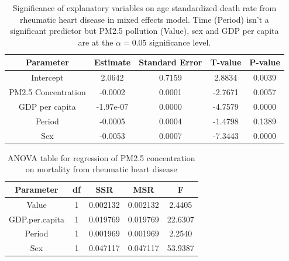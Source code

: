 \documentclass[12pt, letterpaper, twoside]{article}\usepackage[]{graphicx}\usepackage[]{xcolor}
\begin{document}
\begin{table}[h!]
\centering
\begin{tabular}{|c | c c c c|}
\toprule
Parameter & Estimate & Standard Error & T-value & P-value \\ [0.5ex]
\midrule
Intercept &	2.0642 &	0.7159 &	2.8834 &	0.0039 \\
PM2.5 Concentration &	-0.0002 &	0.0001 &	-2.7671 &	0.0057 \\
GDP per capita &	-1.97e-07		 &	0.0000 &	-4.7579 &	0.0000 \\
Period &	-0.0005 &	0.0004 &	-1.4798 &	0.1389 \\
Sex &	-0.0053 &	0.0007 &	-7.3443 &	0.0000 \\[1ex]
\bottomrule
\end{tabular}
\label{tab:table3}
  \caption{Significance of explanatory variables on age standardized death rate
  from rheumatic heart disease in mixed effects model. Time (Period) isn't a
  significant predictor but PM2.5 pollution (Value), sex and GDP per capita are
  at the \begin{math}\alpha = 0.05\end{math} significance level.}
\end{table}

\begin{table}[h!]
\centering
\begin{tabular}{|c | c c c c|}
\toprule
Parameter & df & SSR & MSR & F \\ [0.5ex]
\midrule
Value & 1 & 0.002132 & 0.002132 & 2.4405 \\
GDP.per.capita & 1 & 0.019769 & 0.019769 & 22.6307 \\
Period & 1 & 0.001969 & 0.001969 & 2.2540 \\
Sex & 1 & 0.047117 & 0.047117 & 53.9387 \\ [1ex]
\bottomrule
\end{tabular}
\label{tab:table4}
\caption{ANOVA table for regression of PM2.5 concentration on mortality from
rheumatic heart disease}
\end{table}
\end{document}
